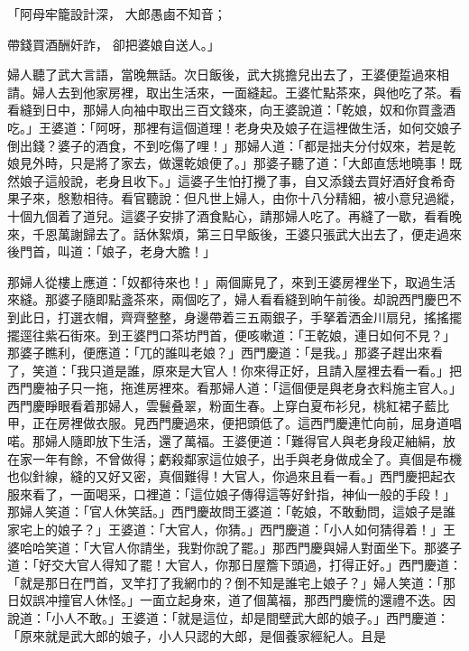\begin{showcontents}{}
「阿母牢籠設計深，  大郎愚鹵不知音；

帶錢買酒酬奸詐，  卻把婆娘自送人。」

婦人聽了武大言語，當晚無話。次日飯後，武大挑擔兒出去了，王婆便踅過來相請。婦人去到他家房裡，取出生活來，一面縫起。王婆忙點茶來，與他吃了茶。看看縫到日中，那婦人向袖中取出三百文錢來，向王婆說道：「乾娘，奴和你買盞酒吃。」王婆道：「阿呀，那裡有這個道理！老身央及娘子在這裡做生活，如何交娘子倒出錢？婆子的酒食，不到吃傷了哩！」那婦人道：「都是拙夫分付奴來，若是乾娘見外時，只是將了家去，做還乾娘便了。」那婆子聽了道：「大郎直恁地曉事！既然娘子這般說，老身且收下。」這婆子生怕打攪了事，自又添錢去買好酒好食希奇果子來，慇懃相待。看官聽說：但凡世上婦人，由你十八分精細，被小意兒過縱，十個九個着了道兒。這婆子安排了酒食點心，請那婦人吃了。再縫了一歇，看看晚來，千恩萬謝歸去了。話休絮煩，第三日早飯後，王婆只張武大出去了，便走過來後門首，叫道：「娘子，老身大膽！」

那婦人從樓上應道：「奴都待來也！」兩個廝見了，來到王婆房裡坐下，取過生活來縫。那婆子隨即點盞茶來，兩個吃了，婦人看看縫到晌午前後。却說西門慶巴不到此日，打選衣帽，齊齊整整，身邊帶着三五兩銀子，手拏着洒金川扇兒，搖搖擺擺逕往紫石街來。到王婆門口茶坊門首，便咳嗽道：「王乾娘，連日如何不見？」那婆子瞧利，便應道：「兀的誰叫老娘？」西門慶道：「是我。」那婆子趕出來看了，笑道：「我只道是誰，原來是大官人！你來得正好，且請入屋裡去看一看。」把西門慶袖子只一拖，拖進房裡來。看那婦人道：「這個便是與老身衣料施主官人。」西門慶睜眼看着那婦人，雲鬟叠翠，粉面生春。上穿白夏布衫兒，桃紅裙子藍比甲，正在房裡做衣服。見西門慶過來，便把頭低了。這西門慶連忙向前，屈身道唱喏。那婦人隨即放下生活，還了萬福。王婆便道：「難得官人與老身段疋紬絹，放在家一年有餘，不曾做得；虧殺鄰家這位娘子，出手與老身做成全了。真個是布機也似針線，縫的又好又密，真個難得！大官人，你過來且看一看。」西門慶把起衣服來看了，一面喝采，口裡道：「這位娘子傳得這等好針指，神仙一般的手段！」那婦人笑道：「官人休笑話。」西門慶故問王婆道：「乾娘，不敢動問，這娘子是誰家宅上的娘子？」王婆道：「大官人，你猜。」西門慶道：「小人如何猜得着！」王婆哈哈笑道：「大官人你請坐，我對你說了罷。」那西門慶與婦人對面坐下。那婆子道：「好交大官人得知了罷！大官人，你那日屋簷下頭過，打得正好。」西門慶道：「就是那日在門首，叉竿打了我網巾的？倒不知是誰宅上娘子？」婦人笑道：「那日奴誤冲撞官人休怪。」一面立起身來，道了個萬福，那西門慶慌的還禮不迭。因說道：「小人不敢。」王婆道：「就是這位，却是間壁武大郎的娘子。」西門慶道：「原來就是武大郎的娘子，小人只認的大郎，是個養家經紀人。且是


\end{showcontents}
